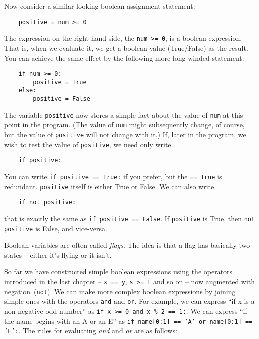 Now consider a similar-looking boolean assignment statement:

\begin{Verbatim}
    positive = num >= 0
\end{Verbatim}

The expression on the right-hand side, the \texttt{num >= 0}, is a
boolean expression.  That is, when we evaluate it, we get a boolean value
(True/False) as the result.
You can achieve
the same effect by the following more long-winded statement:

\begin{Verbatim}
    if num >= 0:
        positive = True
    else:
        positive = False
\end{Verbatim}

\pagebreak

The variable \texttt{positive} now stores a simple fact about the value of
 \texttt{num} at this point in the program.  (The value of  \texttt{num} might
subsequently change, of course, but the value of \texttt{positive} will not
change with it.)  If, later in the program, we wish to test
the value of \texttt{positive}, we need only write

\begin{Verbatim}
    if positive:
\end{Verbatim}

You can write \texttt{if positive == True:} if you prefer, but the
\texttt{== True} 
is redundant.  \texttt{positive} itself is either True or False.  
We can also write

\begin{Verbatim}
    if not positive:
\end{Verbatim}

that is exactly the same as \texttt{if positive == False}. If
\texttt{positive} is True, then \texttt{not positive} is False, and
vice-versa.

Boolean variables are often called \emph{flags}.  The idea is that
a flag has basically two states -- either it's flying or it isn't.

So far we have constructed simple boolean expressions using the operators
introduced in the last chapter -- \texttt{x == y}, \texttt{s >= t} and so on --
now augmented with negation~(\verb+not+).
We can make more complex boolean expressions by joining simple ones
with the operators \verb!and! and \verb!or!.  For example,
we can express ``if x is a non-negative odd number'' as
\verb+if x >= 0 and x % 2 == 1:+. We can express ``if the name begins
with an A or an E'' as \texttt{if name[0:1] == 'A' or
  name[0:1] == 'E':}.  The rules for evaluating \emph{and}
and \emph{or} are as follows:


